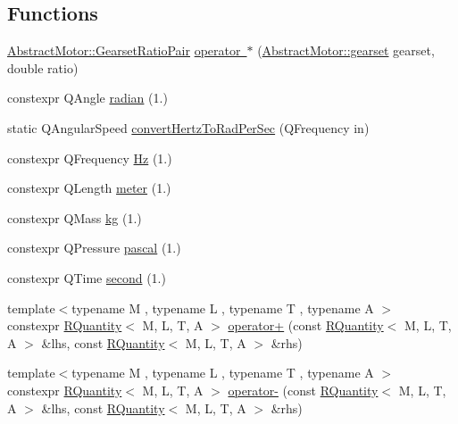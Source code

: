 \subsection*{Functions}
\begin{DoxyCompactItemize}
\item 
\mbox{\hyperlink{structokapi_1_1AbstractMotor_1_1GearsetRatioPair}{Abstract\+Motor\+::\+Gearset\+Ratio\+Pair}} \mbox{\hyperlink{namespaceokapi_ade4f34671410d2b847d7b0366ab60ba1}{operator $\ast$}} (\mbox{\hyperlink{classokapi_1_1AbstractMotor_a88aaa6ea2fa10f5520a537bbf26774d5}{Abstract\+Motor\+::gearset}} gearset, double ratio)
\item 
constexpr Q\+Angle \mbox{\hyperlink{namespaceokapi_a58aeaa1abc59d23d0790a77d53f1d26b}{radian}} (1.)
\item 
static Q\+Angular\+Speed \mbox{\hyperlink{namespaceokapi_a06879c25af60ece2ce818b93b6d8b681}{convert\+Hertz\+To\+Rad\+Per\+Sec}} (Q\+Frequency in)
\item 
constexpr Q\+Frequency \mbox{\hyperlink{namespaceokapi_a42f10a655cddac477a7be71e1b296320}{Hz}} (1.)
\item 
constexpr Q\+Length \mbox{\hyperlink{namespaceokapi_a59563b3d4b18633f1c8d852e2932d1db}{meter}} (1.)
\item 
constexpr Q\+Mass \mbox{\hyperlink{namespaceokapi_afcc67eb55c70e21f82cbee49aa19d05a}{kg}} (1.)
\item 
constexpr Q\+Pressure \mbox{\hyperlink{namespaceokapi_accda0a1a99e1aafa43e8ef14201374ad}{pascal}} (1.)
\item 
constexpr Q\+Time \mbox{\hyperlink{namespaceokapi_ae9ece1daf9cd9f6d3a597cc5c0dc7b40}{second}} (1.)
\item 
{\footnotesize template$<$typename M , typename L , typename T , typename A $>$ }\\constexpr \mbox{\hyperlink{classokapi_1_1RQuantity}{R\+Quantity}}$<$ M, L, T, A $>$ \mbox{\hyperlink{namespaceokapi_a20ba46b94c486e1b70ef5cb364ffe086}{operator+}} (const \mbox{\hyperlink{classokapi_1_1RQuantity}{R\+Quantity}}$<$ M, L, T, A $>$ \&lhs, const \mbox{\hyperlink{classokapi_1_1RQuantity}{R\+Quantity}}$<$ M, L, T, A $>$ \&rhs)
\item 
{\footnotesize template$<$typename M , typename L , typename T , typename A $>$ }\\constexpr \mbox{\hyperlink{classokapi_1_1RQuantity}{R\+Quantity}}$<$ M, L, T, A $>$ \mbox{\hyperlink{namespaceokapi_ab3362da609b98790e6301285a939545f}{operator-\/}} (const \mbox{\hyperlink{classokapi_1_1RQuantity}{R\+Quantity}}$<$ M, L, T, A $>$ \&lhs, const \mbox{\hyperlink{classokapi_1_1RQuantity}{R\+Quantity}}$<$ M, L, T, A $>$ \&rhs)

\end{DoxyCompactItemize}
